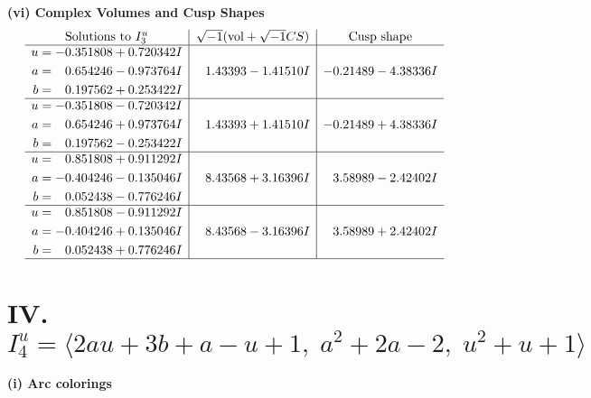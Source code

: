 \documentclass[1p]{elsarticle_modified}
\theoremstyle{definition}
\newcommand{\I}{\sqrt{-1}}
\begin{document}
\newpage\flushleft \textbf{(vi) Complex Volumes and Cusp Shapes}
$$\begin{array}{c|c|c}  
\text{Solutions to }I^u_{3}& \I (\text{vol} + \sqrt{-1}CS) & \text{Cusp shape}\\
 \hline 
\begin{aligned}
u &= -0.351808 + 0.720342 I \\
a &= \phantom{-}0.654246 - 0.973764 I \\
b &= \phantom{-}0.197562 + 0.253422 I\end{aligned}
 & \phantom{-}1.43393 - 1.41510 I & -0.21489 - 4.38336 I \\ \hline\begin{aligned}
u &= -0.351808 - 0.720342 I \\
a &= \phantom{-}0.654246 + 0.973764 I \\
b &= \phantom{-}0.197562 - 0.253422 I\end{aligned}
 & \phantom{-}1.43393 + 1.41510 I & -0.21489 + 4.38336 I \\ \hline\begin{aligned}
u &= \phantom{-}0.851808 + 0.911292 I \\
a &= -0.404246 - 0.135046 I \\
b &= \phantom{-}0.052438 - 0.776246 I\end{aligned}
 & \phantom{-}8.43568 + 3.16396 I & \phantom{-}3.58989 - 2.42402 I \\ \hline\begin{aligned}
u &= \phantom{-}0.851808 - 0.911292 I \\
a &= -0.404246 + 0.135046 I \\
b &= \phantom{-}0.052438 + 0.776246 I\end{aligned}
 & \phantom{-}8.43568 - 3.16396 I & \phantom{-}3.58989 + 2.42402 I\\
 \hline 
 \end{array}$$\newpage\newpage\renewcommand{\arraystretch}{1}
\centering \section*{IV. $I^u_{4}= \langle 2 a u+3 b+a- u+1,\;a^2+2 a-2,\;u^2+u+1 \rangle$}
\flushleft \textbf{(i) Arc colorings}\\
\end{document}
